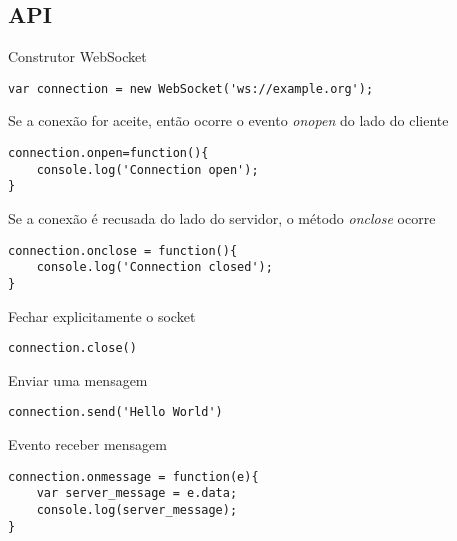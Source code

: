 \subsection{API}
Construtor WebSocket
\begin{verbatim}
var connection = new WebSocket('ws://example.org');
\end{verbatim}
Se a conexão for aceite, então ocorre o evento \textit{onopen} do lado do cliente
\begin{verbatim}
connection.onpen=function(){
	console.log('Connection open');
}
\end{verbatim}
Se a conexão é recusada do lado do servidor, o método \textit{onclose} ocorre
\begin{verbatim}
connection.onclose = function(){
	console.log('Connection closed');
}
\end{verbatim}
Fechar explicitamente o socket
\begin{verbatim}
connection.close()
\end{verbatim}
Enviar uma mensagem
\begin{verbatim}
connection.send('Hello World')
\end{verbatim}
Evento receber mensagem
\begin{verbatim}
connection.onmessage = function(e){
	var server_message = e.data;
	console.log(server_message);
}
\end{verbatim}

